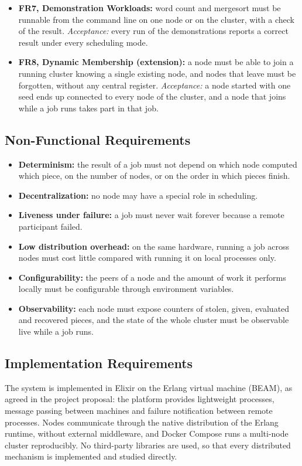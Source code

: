 \documentclass{scrartcl}
\begin{document}
\begin{itemize}
  \item \textbf{FR7, Demonstration Workloads:} word count and mergesort must be runnable from the command line on one node or on the cluster, with a check of the result.
  \emph{Acceptance:} every run of the demonstrations reports a correct result under every scheduling mode.

  \item \textbf{FR8, Dynamic Membership (extension):} a node must be able to join a running cluster knowing a single existing node, and nodes that leave must be forgotten, without any central register.
  \emph{Acceptance:} a node started with one seed ends up connected to every node of the cluster, and a node that joins while a job runs takes part in that job.
\end{itemize}

\subsection{Non-Functional Requirements}

\begin{itemize}
  \item \textbf{Determinism:} the result of a job must not depend on which node computed which piece, on the number of nodes, or on the order in which pieces finish.
  \item \textbf{Decentralization:} no node may have a special role in scheduling.
  \item \textbf{Liveness under failure:} a job must never wait forever because a remote participant failed.
  \item \textbf{Low distribution overhead:} on the same hardware, running a job across nodes must cost little compared with running it on local processes only.
  \item \textbf{Configurability:} the peers of a node and the amount of work it performs locally must be configurable through environment variables.
  \item \textbf{Observability:} each node must expose counters of stolen, given, evaluated and recovered pieces, and the state of the whole cluster must be observable live while a job runs.
\end{itemize}

\subsection{Implementation Requirements}

The system is implemented in Elixir on the Erlang virtual machine (BEAM), as agreed in the project proposal: the platform provides lightweight processes, message passing between machines and failure notification between remote processes.
%
Nodes communicate through the native distribution of the Erlang runtime, without external middleware, and Docker Compose runs a multi-node cluster reproducibly.
%
No third-party libraries are used, so that every distributed mechanism is implemented and studied directly.
\end{document}
